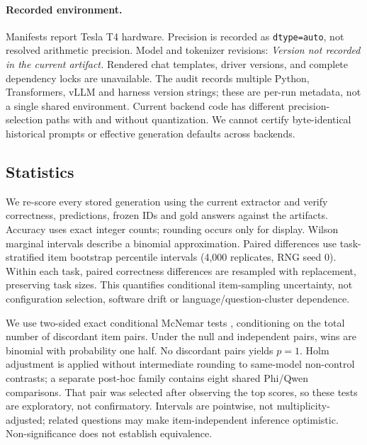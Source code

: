 \paragraph{Recorded environment.}
Manifests report Tesla T4 hardware. Precision is recorded as \texttt{dtype=auto}, not resolved arithmetic precision. Model and tokenizer revisions: \emph{Version not recorded in the current artifact.} Rendered chat templates, driver versions, and complete dependency locks are unavailable. The audit records multiple Python, Transformers, vLLM and harness version strings; these are per-run metadata, not a single shared environment. Current backend code has different precision-selection paths with and without quantization. We cannot certify byte-identical historical prompts or effective generation defaults across backends.

\subsection{Statistics}
We re-score every stored generation using the current extractor and verify correctness, predictions, frozen IDs and gold answers against the artifacts. Accuracy uses exact integer counts; rounding occurs only for display. Wilson marginal intervals \citep{wilson1927probable} describe a binomial approximation. Paired differences use task-stratified item bootstrap percentile intervals (4,000 replicates, RNG seed 0). Within each task, paired correctness differences are resampled with replacement, preserving task sizes. This quantifies conditional item-sampling uncertainty, not configuration selection, software drift or language/question-cluster dependence.

We use two-sided exact conditional McNemar tests \citep{mcnemar1947note}, conditioning on the total number of discordant item pairs. Under the null and independent pairs, wins are binomial with probability one half. No discordant pairs yields $p=1$. Holm adjustment \citep{holm1979simple} is applied without intermediate rounding to \ContrastCount{} same-model non-control contrasts; a separate post-hoc family contains eight shared Phi/Qwen comparisons. That pair was selected after observing the top scores, so these tests are exploratory, not confirmatory. Intervals are pointwise, not multiplicity-adjusted; related questions may make item-independent inference optimistic. Non-significance does not establish equivalence.


